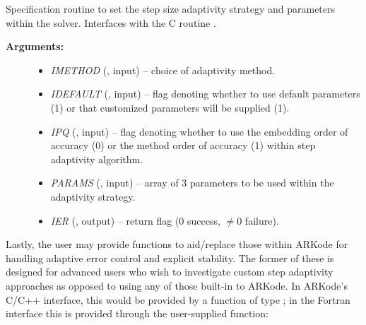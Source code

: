\documentclass[letterpaper,10pt,english]{sphinxmanual}
\begin{document}
\begin{fulllineitems}
\label{f_interface/Usage:f/_/FARKSETADAPTIVITYMETHOD}
Specification routine to set the step size adaptivity strategy and
parameters within the {\hyperref[f_interface/Usage:f/_/FARKODE]{}} solver.  Interfaces with
the C routine {\hyperref[c_interface/User_callable:ARKodeSetAdaptivityMethod]{}}.
\begin{description}
\item[{\textbf{Arguments:}}] \leavevmode\begin{itemize}
\item {} 
\emph{IMETHOD} (, input) -- choice of adaptivity method.

\item {} 
\emph{IDEFAULT} (, input) -- flag denoting whether to use
default parameters (1) or that customized parameters will be
supplied (1).

\item {} 
\emph{IPQ} (, input) -- flag denoting whether to use
the embedding order of accuracy (0) or the method order of
accuracy (1) within step adaptivity algorithm.

\item {} 
\emph{PARAMS} (, input) -- array of 3 parameters to be
used within the adaptivity strategy.

\item {} 
\emph{IER} (, output) -- return flag (0 success, $\ne 0$ failure).

\end{itemize}

\end{description}

\end{fulllineitems}


Lastly, the user may provide functions to aid/replace those within
ARKode for handling adaptive error control and explicit stability.
The former of these is designed for advanced users who wish to
investigate custom step adaptivity approaches as opposed to using any
of those built-in to ARKode.  In ARKode's C/C++ interface, this would be
provided by a function of type {\hyperref[c_interface/User_supplied:ARKAdaptFn]{}}; in the Fortran
interface this is provided through the user-supplied function:
\end{document}
